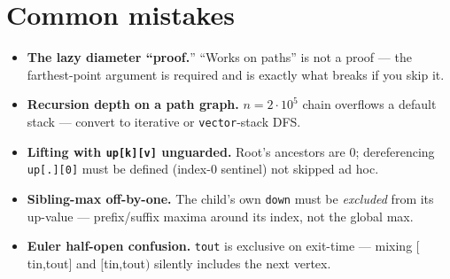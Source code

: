 \section{Common mistakes}
\begin{itemize}
\item \textbf{The lazy diameter ``proof.}'' ``Works on paths'' is not
a proof --- the farthest-point argument is required and is exactly
what breaks if you skip it.
\item \textbf{Recursion depth on a path graph.} $n=2\cdot10^5$ chain
overflows a default stack --- convert to iterative or
\texttt{vector}-stack DFS.
\item \textbf{Lifting with \texttt{up[k][v]} unguarded.} Root's
ancestors are 0; dereferencing \texttt{up[.][0]} must be defined
(index-0 sentinel) not skipped ad hoc.
\item \textbf{Sibling-max off-by-one.} The child's own \texttt{down}
must be \emph{excluded} from its up-value --- prefix/suffix maxima
around its index, not the global max.
\item \textbf{Euler half-open confusion.} \texttt{tout} is exclusive
on exit-time --- mixing $[$tin,tout$]$ and $[$tin,tout$)$ silently
includes the next vertex.
\end{itemize}


